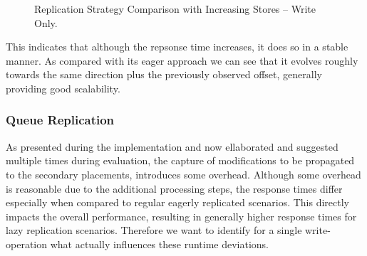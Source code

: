 \begin{figure}[t] 
    \centering 
    \centering
    \caption{Replication Strategy Comparison with Increasing Stores -- Write Only.}
    \label{fig:stores_comp}
\end{figure}

This indicates that although the repsonse time increases, it does so in a stable manner. As compared with its eager approach we can see that it evolves roughly towards the same direction plus the
previously observed offset, generally providing good scalability.

\subsubsection{Queue Replication}


As presented during the implementation and now ellaborated and suggested multiple times during evaluation, 
the capture of modifications to be propagated to the secondary placements, introduces some overhead. Although some overhead
is reasonable due to the additional processing steps, the response times differ 
especially when compared to regular eagerly replicated scenarios. This directly impacts the overall performance,
resulting in generally higher response times for lazy replication scenarios.
Therefore we want to identify for a single write-operation what actually influences these runtime deviations.


